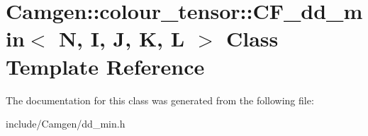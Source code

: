 \hypertarget{a00036}{\section{Camgen\-:\-:colour\-\_\-tensor\-:\-:C\-F\-\_\-dd\-\_\-min$<$ N, I, J, K, L $>$ Class Template Reference}
\label{a00036}
}


The documentation for this class was generated from the following file\-:\begin{DoxyCompactItemize}
\item 
include/\-Camgen/dd\-\_\-min.\-h\end{DoxyCompactItemize}
